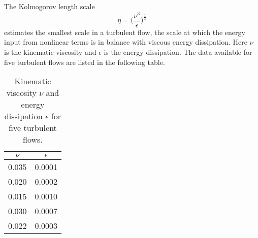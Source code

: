 \documentclass[12pt]{exam}
\newcommand{\matlab}{{\sc Matlab}}
\begin{document}
\begin{questions}
\question The Kolmogorov length scale
\[\eta = \bigg(\frac{\nu^3}{\epsilon}\bigg)^{\frac14}\]
estimates the smallest scale in a turbulent flow, the scale at which the energy input from nonlinear terms is in balance with viscous energy dissipation. Here $\nu$ is the kinematic viscosity and $\epsilon$ is the energy dissipation. The data available for five turbulent flows are listed in the following table.

\begin{table}[t]
\centering
\begin{tabular}{|c|c|}
	\hline
	$\nu$ & $\epsilon$ \\ \hline
	0.035 & 0.0001 \\
	0.020 & 0.0002 \\
	0.015 & 0.0010 \\
	0.030 & 0.0007 \\
	0.022 & 0.0003 \\ \hline
\end{tabular}
\caption{Kinematic viscosity $\nu$ and energy dissipation $\epsilon$ for five turbulent flows.\label{tab:kolmogorov}}
\end{table}



\end{questions}
\end{document}
